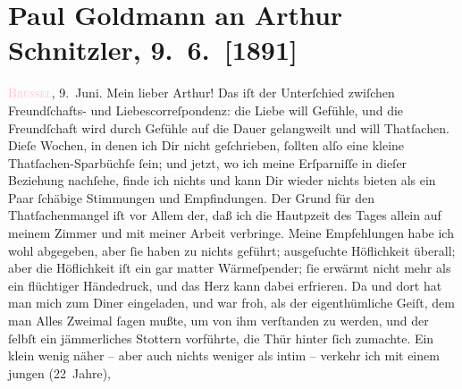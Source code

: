 

               \section[Paul Goldmann an Arthur Schnitzler, 9. 6. {[}1891{]}]{ Paul Goldmann an Arthur Schnitzler, 9. 6. {[}1891{]}}\nopagebreak{}\rehead{ }\normalsize\beginnumbering{} \toendnotes[C]{\smallbreak\pagebreak[2]} 
\toendnotes[C]{\smallbreak}\pstart
           \raggedleft{}{\pb}\textsc{\textcolor{pink}{Brüssel}{}\ledrightnote{\textcolor{pink}{Brüssel}}}, 9. Juni.\pend
           \pstart\center{}Mein lieber Arthur!\pend\pstart
           Das iſt der Unterſchied zwiſchen Freundſchafts- und Liebescorreſpondenz: die Liebe
               will Gefühle, und die Freundſchaft wird durch Gefühle auf die Dauer gelangweilt und
               will Thatſachen. Dieſe Wochen, in denen ich Dir nicht geſchrieben, ſollten alſo eine
               kleine Thatſachen-Sparbüchſe ſein; und jetzt, wo ich meine Erſparniſſe in dieſer
               Beziehung nachſehe, finde ich nichts und kann Dir wieder nichts bieten als ein Paar
               ſchäbige Stimmungen und Empfindungen. Der Grund für den Thatſachenmangel iſt vor
               Allem der, daß ich die Hautpzeit des Tages allein auf meinem Zimmer und mit meiner
               Arbeit verbringe. Meine Empfehlungen habe ich wohl abgegeben, aber ſie haben zu
               nichts geführt; ausgeſuchte Höflichkeit überall; aber die Höflichkeit iſt ein gar
               matter Wärmeſpender; ſie erwärmt nicht mehr als ein flüchtiger Händedruck, und das
               Herz kann dabei erfrieren. Da und dort hat man mich zum Diner eingeladen, und war
               froh, als der eigenthümliche Geiſt, dem man Alles Zweimal ſagen mußte, um von ihm
               verſtanden zu werden, und der ſelbſt ein jämmerliches Stottern vorführte, die {\pb}Thür hinter ſich zumachte. Ein klein wenig näher –
               aber auch nichts weniger als intim – verkehr ich mit einem jungen \label{K_L02664-5v}\label{K_L02664-5h} (22 Jahre),
